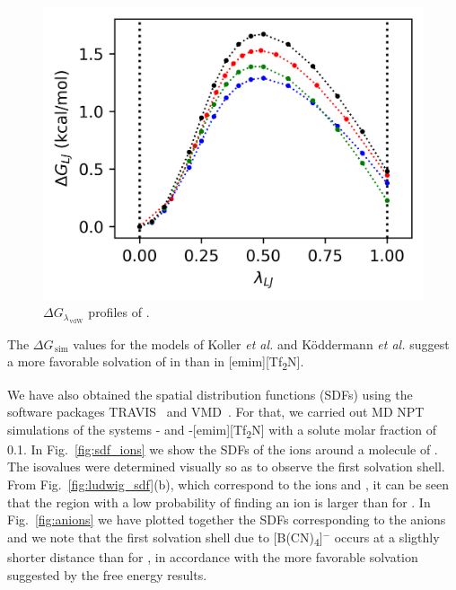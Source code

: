 \documentclass[3p,twocolumn]{elsarticle}
\begin{document}
\begin{figure}[]
\includegraphics[width=\linewidth]{free_energy_paper}
\caption{$\Delta G_{\lambda_{\,\text{vdW}}}$ profiles of \ce{[emim][B(CN)_4]}.}
\label{fig:deltag}
\end{figure}

The $\Delta G_{\, \text{sim}}$ values for the models of Koller \textit{et al.} \cite{Koller_2012} and K\"{o}ddermann \textit{et al.} \cite{K_ddermann_2007} suggest a more favorable solvation of  in \ce{[emim][B(CN)_4]} than in [emim][Tf\textsubscript{2}N]. 

We have also obtained the spatial distribution functions (SDFs) \cite{Svishchev_1993} using the software packages TRAVIS~\cite{Brehm_2011} and VMD~\cite{HUMP96}. For that, we carried out MD NPT simulations of the systems -\ce{[emim][B(CN)_4]} and -[emim][Tf\textsubscript{2}N] with a solute molar fraction of 0.1. In Fig.~\ref{fig:sdf_ions} we show the SDFs of the ions around a molecule of . The isovalues were determined visually so as to observe the first solvation shell. From Fig.~\ref{fig:ludwig_sdf}(b), which correspond to the ions \ce{[emim]^+} and \ce{[NTf_2]^-}, it can be seen that the region with a low probability of finding an ion is larger than for \ce{[emim][B(CN)_4]}. In Fig.~\ref{fig:anions} we have plotted together the SDFs corresponding to the anions and we note that the first solvation shell due to [B(CN)\textsubscript{4}]$^{-}$ occurs at a sligthly shorter distance than for \ce{[NTf_2]^-}, in accordance with the more favorable solvation suggested by the free energy results.
\end{document}
